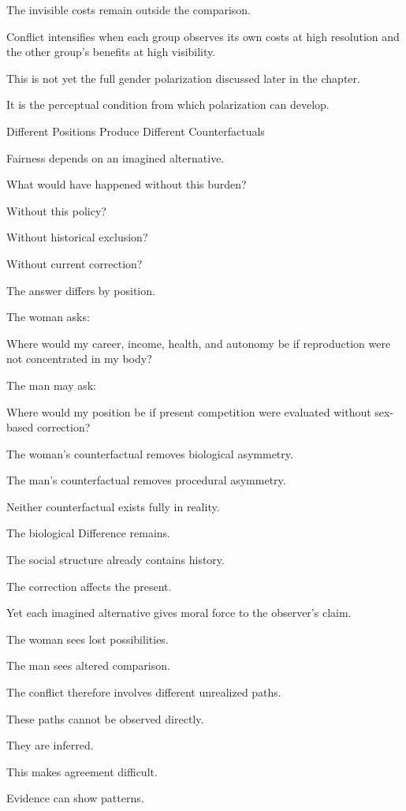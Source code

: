 The invisible costs remain outside the comparison.

Conflict intensifies when each group observes its own costs at high resolution and the other group’s benefits at high visibility.

This is not yet the full gender polarization discussed later in the chapter.

It is the perceptual condition from which polarization can develop.

Different Positions Produce Different Counterfactuals

Fairness depends on an imagined alternative.

What would have happened without this burden?

Without this policy?

Without historical exclusion?

Without current correction?

The answer differs by position.

The woman asks:

Where would my career, income, health, and autonomy be if reproduction were not concentrated in my body?

The man may ask:

Where would my position be if present competition were evaluated without sex-based correction?

The woman’s counterfactual removes biological asymmetry.

The man’s counterfactual removes procedural asymmetry.

Neither counterfactual exists fully in reality.

The biological Difference remains.

The social structure already contains history.

The correction affects the present.

Yet each imagined alternative gives moral force to the observer’s claim.

The woman sees lost possibilities.

The man sees altered comparison.

The conflict therefore involves different unrealized paths.

These paths cannot be observed directly.

They are inferred.

This makes agreement difficult.

Evidence can show patterns.

